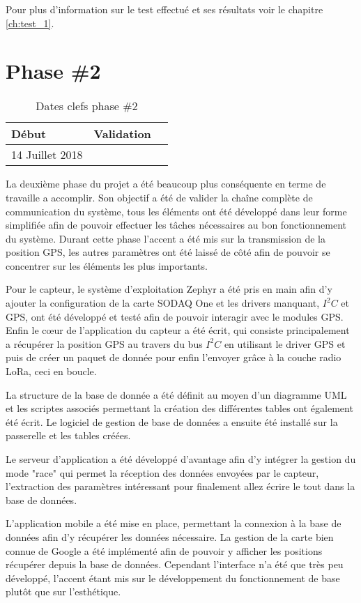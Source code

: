 Pour plus d'information sur le test effectué et ses résultats voir le chapitre \ref{ch:test_1}.

\section{Phase \#2}

\begin{table}[htb]
\caption{Dates clefs phase \#2}
\label{tab:detail_phase_2}
\centering
\begin{tabular}{ l l l }
\toprule
Début & Validation \\
\midrule
14 Juillet 2018 & \todo{}  \\
\bottomrule 
\end{tabular}
\end{table}

La deuxième phase du projet a été beaucoup plus conséquente en terme de travaille a accomplir. Son objectif a été de valider la chaîne complète de communication du système, tous les éléments ont été développé dans leur forme simplifiée afin de pouvoir effectuer les tâches nécessaires au bon fonctionnement du système. Durant cette phase l'accent a été mis sur la transmission de la position GPS, les autres paramètres ont été laissé de côté afin de pouvoir se concentrer sur les éléments les plus importants.

Pour le capteur, le système d'exploitation Zephyr a été pris en main afin d'y ajouter la configuration de la carte SODAQ One et les drivers manquant, $I^{2}C$ et GPS, ont été développé et testé afin de pouvoir interagir avec le modules GPS. Enfin le cœur de l'application du capteur a été écrit, qui consiste principalement a récupérer la position GPS au travers du bus $I^{2}C$ en utilisant le driver GPS et puis de créer un paquet de donnée pour enfin l'envoyer grâce à la couche radio LoRa, ceci en boucle.

La structure de la base de donnée a été définit au moyen d'un diagramme UML et les scriptes associés permettant la création des différentes tables ont également été écrit. Le logiciel de gestion de base de données a ensuite été installé sur la passerelle et les tables créées.

Le serveur d'application a été développé d'avantage afin d'y intégrer la gestion du mode "race" qui permet la réception des données envoyées par le capteur, l'extraction des paramètres intéressant pour finalement allez écrire le tout dans la base de données.

L'application mobile a été mise en place, permettant la connexion à la base de données afin d'y récupérer les données nécessaire. La gestion de la carte bien connue de Google a été implémenté afin de pouvoir y afficher les positions récupérer depuis la base de données. Cependant l'interface n'a été que très peu développé, l'accent étant mis sur le développement du fonctionnement de base plutôt que sur l'esthétique.

